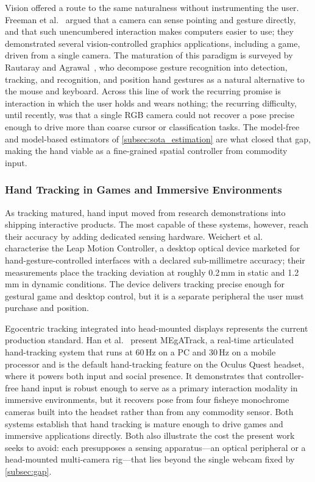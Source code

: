 Vision offered a route to the same naturalness without instrumenting the user.
Freeman et al.~\cite{freeman1998vision} argued that a camera can sense pointing
and gesture directly, and that such unencumbered interaction makes computers
easier to use; they demonstrated several vision-controlled graphics
applications, including a game, driven from a single camera.
The maturation of this paradigm is surveyed by Rautaray and
Agrawal~\cite{rautaray2015vision}, who decompose gesture recognition into
detection, tracking, and recognition, and position hand gestures as a natural
alternative to the mouse and keyboard.
Across this line of work the recurring promise is interaction in which the user
holds and wears nothing; the recurring difficulty, until recently, was that a
single RGB camera could not recover a pose precise enough to drive
more than coarse cursor or classification tasks.
The model-free and model-based estimators of \autoref{subsec:sota_estimation}
are what closed that gap, making the hand viable as a fine-grained spatial
controller from commodity input.



\subsubsection{Hand Tracking in Games and Immersive Environments}\label{subsubsec:sota_immersive}

As tracking matured, hand input moved from research demonstrations into shipping
interactive products.
The most capable of these systems, however, reach their accuracy by adding
dedicated sensing hardware.
Weichert et al.~\cite{weichert2013leap} characterise the Leap Motion Controller,
a desktop optical device marketed for hand-gesture-controlled interfaces with a
declared sub-millimetre accuracy; their measurements place the tracking
deviation at roughly 0.2\,mm in static and 1.2\,mm in dynamic conditions.
The device delivers tracking precise enough for gestural game and desktop
control, but it is a separate peripheral the user must purchase and position.

Egocentric tracking integrated into head-mounted displays represents the
current production standard.
Han et al.~\cite{han2020megatrack} present MEgATrack, a real-time articulated
hand-tracking system that runs at 60\,Hz on a PC and 30\,Hz on
a mobile processor and is the default hand-tracking feature on the Oculus Quest
headset, where it powers both input and social presence.
It demonstrates that controller-free hand input is robust enough to serve as a
primary interaction modality in immersive environments, but it recovers pose
from four fisheye monochrome cameras built into the headset rather than from any
commodity sensor.
Both systems establish that hand tracking is mature enough to drive games and
immersive applications directly.
Both also illustrate the cost the present work seeks to avoid: each presupposes
a sensing apparatus---an optical peripheral or a head-mounted multi-camera
rig---that lies beyond the single webcam fixed by \autoref{subsec:gap}.




